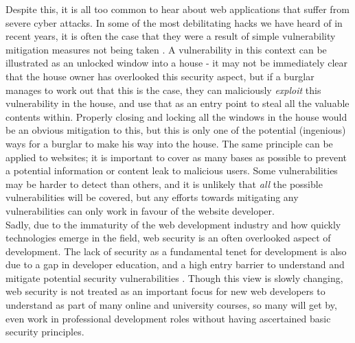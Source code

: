 Despite this, it is all too common to hear about web applications that suffer from severe cyber attacks. In some of the most debilitating hacks we have heard of in recent years, it is often the case that they were a result of simple vulnerability mitigation measures not being taken \cite{stuxnextHacks, wannaCryHacks, equifaxHacks}. A vulnerability in this context can be illustrated as an unlocked window into a house - it may not be immediately clear that the house owner has overlooked this security aspect, but if a burglar manages to work out that this is the case, they can maliciously \textit{exploit} this vulnerability in the house, and use that as an entry point to steal all the valuable contents within. Properly closing and locking all the windows in the house would be an obvious mitigation to this, but this is only one of the potential (ingenious) ways for a burglar to make his way into the house. The same principle can be applied to websites; it is important to cover as many bases as possible to prevent a potential information or content leak to malicious users. Some vulnerabilities may be harder to detect than others, and it is unlikely that \textit{all} the possible vulnerabilities will be covered, but any efforts towards mitigating any vulnerabilities can only work in favour of the website developer.  \\

Sadly, due to the immaturity of the web development industry and how quickly technologies emerge in the field, web security is an often overlooked aspect of development. 
The lack of security as a fundamental tenet for development is also due to a gap in developer education, and a high entry barrier to understand and mitigate potential security vulnerabilities \cite{veracodeDevopsSurvey}. 
Though this view is slowly changing, web security is not treated as an important focus for new web developers to understand as part of many online and university courses, so many will get by, even work in professional development roles without having ascertained basic security principles. \\

